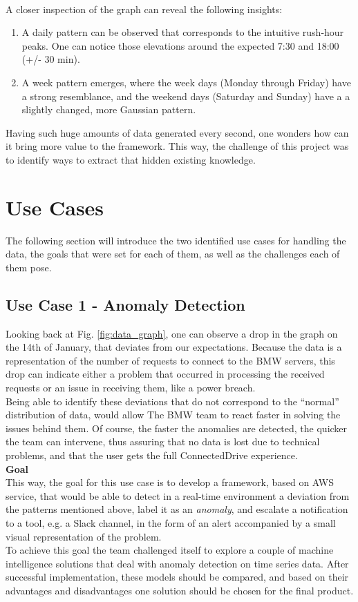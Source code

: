 \\
A closer inspection of the graph can reveal the following insights:
\begin{enumerate}
    \item A daily pattern can be observed that corresponds to the intuitive rush-hour peaks. One can notice those elevations around the expected 7:30 and 18:00 (+/- 30 min).
    \item A week pattern emerges, where the week days (Monday through Friday) have a strong resemblance, and the weekend days (Saturday and Sunday) have a a slightly changed, more Gaussian pattern.
\end{enumerate}

Having such huge amounts of data generated every second, one wonders how can it bring more value to the framework. This way, the challenge of this project was to identify ways to extract that hidden existing knowledge. 

\section{Use Cases}
The following section will introduce the two identified use cases for handling the data, the goals that were set for each of them, as well as the challenges each of them pose.
    \subsection{Use Case 1 - Anomaly Detection}
     \label{sec:use_case1}
      Looking back at Fig. \ref{fig:data_graph}, one can observe a drop in the graph on the 14th of January, that deviates from our expectations. Because the data is a representation of the number of requests to connect to the BMW servers, this drop can indicate either a problem that occurred in processing the received requests or an issue in receiving them, like a power breach.  \\
      Being able to identify these deviations that do not correspond to the “normal” distribution of data, would allow The BMW team to react faster in solving the issues behind them. Of course, the faster the anomalies are detected, the quicker the team can intervene, thus assuring that no data is lost due to technical problems, and that the user gets the full ConnectedDrive experience. \\
      
\textbf{Goal}\\
    This way, the goal for this use case is to develop a framework, based on AWS service, that would be able to detect in a real-time environment a deviation from the patterns mentioned above, label it as an \emph{anomaly}, and escalate a notification to a tool, e.g. a Slack channel, in the form of an alert accompanied by a small visual representation of the problem.\\
    To achieve this goal the team challenged itself to explore a couple of machine intelligence solutions that deal with anomaly detection on time series data. After successful implementation, these models should be compared, and based on their advantages and disadvantages one solution should be chosen for the final product.\\
    
